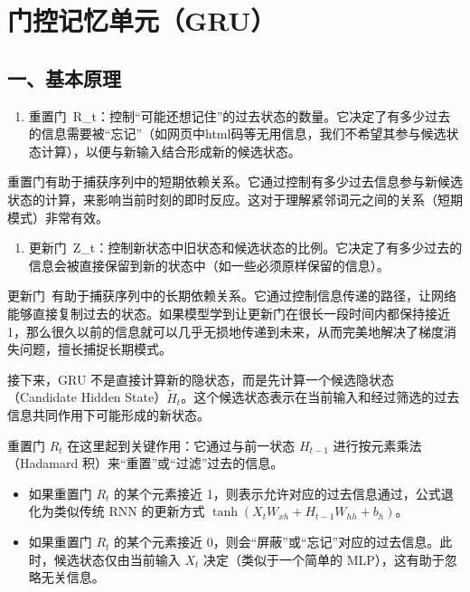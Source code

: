 \setcounter{section}{3}

\hypertarget{ux95e8ux63a7ux8bb0ux5fc6ux5355ux5143gru}{%
\section{门控记忆单元（GRU）}\label{ux95e8ux63a7ux8bb0ux5fc6ux5355ux5143gru}}

\hypertarget{ux4e00ux57faux672cux539fux7406}{%
\subsection{一、基本原理}\label{ux4e00ux57faux672cux539fux7406}}

\begin{enumerate}
\def\labelenumi{\arabic{enumi}.}
\tightlist
\item
  重置门~R\_t：控制``可能还想记住''的过去状态的数量。它决定了有多少过去的信息需要被``忘记''（如网页中html码等无用信息，我们不希望其参与候选状态计算），以便与新输入结合形成新的候选状态。
\end{enumerate}

重置门有助于捕获序列中的短期依赖关系。它通过控制有多少过去信息参与新候选状态的计算，来影响当前时刻的即时反应。这对于理解紧邻词元之间的关系（短期模式）非常有效。

\begin{enumerate}
\def\labelenumi{\arabic{enumi}.}
\setcounter{enumi}{1}
\tightlist
\item
  更新门~Z\_t：控制新状态中旧状态和候选状态的比例。它决定了有多少过去的信息会被直接保留到新的状态中（如一些必须原样保留的信息）。
\end{enumerate}

更新门~有助于捕获序列中的长期依赖关系。它通过控制信息传递的路径，让网络能够直接复制过去的状态。如果模型学到让更新门在很长一段时间内都保持接近1，那么很久以前的信息就可以几乎无损地传递到未来，从而完美地解决了梯度消失问题，擅长捕捉长期模式。

接下来，GRU 不是直接计算新的隐状态，而是先计算一个候选隐状态（Candidate Hidden State）\(\tilde{H}_t\)。这个候选状态表示在当前输入和经过筛选的过去信息共同作用下可能形成的新状态。

重置门 \(R_t\) 在这里起到关键作用：它通过与前一状态 \(H_{t-1}\) 进行按元素乘法（Hadamard 积）来``重置''或``过滤''过去的信息。

\begin{itemize}
\tightlist
\item
  如果重置门 \(R_t\) 的某个元素接近 1，则表示允许对应的过去信息通过，公式退化为类似传统 RNN 的更新方式 \(\tanh(X_t W_{xh} + H_{t-1}W_{hh} + b_h)\)。
\item
  如果重置门 \(R_t\) 的某个元素接近 0，则会``屏蔽''或``忘记''对应的过去信息。此时，候选状态仅由当前输入 \(X_t\) 决定（类似于一个简单的 MLP），这有助于忽略无关信息。
\end{itemize}

